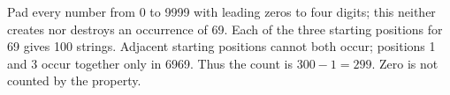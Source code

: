 Pad every number from 0 to 9999 with leading zeros to four digits; this neither creates nor destroys an occurrence of 69. Each of the three starting positions for 69 gives 100 strings. Adjacent starting positions cannot both occur; positions 1 and 3 occur together only in 6969. Thus the count is $300-1=\boxed{299}$. Zero is not counted by the property.
